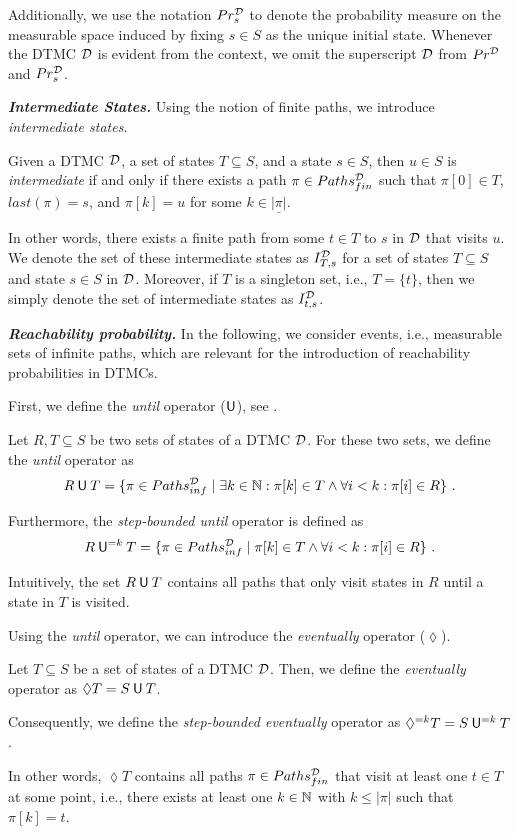 Additionally, we use the notation $Pr^{\mathcal{D}}_s$ to denote the probability measure on the measurable space induced by fixing $s\in S$ as the unique initial state. Whenever the DTMC $\mathcal{D}$ is evident from the context, we omit the superscript $\mathcal{D}$ from $Pr^{\mathcal{D}}$ and $Pr_s^{\mathcal{D}}$.

\emph{\textbf{Intermediate States.}} Using the notion of finite paths, we introduce \textit{intermediate states}.

\begin{definition}\label{def:intermediate_state}
    Given a DTMC $\mathcal{D}$, a set of states $T\subseteq S$, and a state $s \in S$, then $u\in S$ is \textit{intermediate} if and only if there exists a path $\pi \in Paths^{\mathcal{D}}_{fin}$ such that $\pi[0]\in T$, $last(\pi) = s$, and $\pi[k] = u$ for some $k\in \underline{|\pi|}$. 
\end{definition}
In other words, there exists a finite path from some $t\in T$ to $s$ in $\mathcal{D}$ that visits $u$.
We denote the set of these intermediate states as $I^{\mathcal{D}}_{T,s}$ for a set of states $T\subseteq S$ and state $s\in S$ in $\mathcal{D}$. Moreover, if $T$ is a singleton set, i.e., $T =\{t\}$, then we simply denote the set of intermediate states as $I^{\mathcal{D}}_{t,s}$.

\emph{\textbf{Reachability probability.}} In the following, we consider events, i.e., measurable sets of infinite paths, which are relevant for the introduction of reachability probabilities in DTMCs.

First, we define the \textit{until} operator ($\mathbin{\mathsf{U}}$), see \cite{Bibel}.
\begin{definition}\label{def:constrained_reachability_probabilities}
    Let $R,T \subseteq S$ be two sets of states of a DTMC $\mathcal{D}$. For these two sets, we define the \textit{until} operator as
    \[R\mathbin{\mathsf{U}} T = \{\pi \in Paths^{\mathcal{D}}_{inf}\mid\exists k\in \mathbb{N}: \pi[k]\in T\land \forall i <k: \pi [i]\in R\} \ .\]

    Furthermore, the \textit{step-bounded until} operator is defined as
    \[R\mathbin{\mathsf{U}}^{=k} T = \{\pi \in Paths^{\mathcal{D}}_{inf} \mid \pi[k]\in T\land \forall i <k: \pi [i]\in R\} \ .\]

\end{definition}
Intuitively, the set $R\mathbin{\mathsf{U}} T$ contains all paths that only visit states in $R$ until a state in $T$ is visited.

Using the \textit{until} operator, we can introduce the \textit{eventually} operator ($\lozenge$).

\begin{definition}
    Let $T\subseteq S$ be a set of states of a DTMC $\mathcal{D}$. Then, we define the \textit{eventually} operator as $\lozenge T = S \mathbin{\mathsf{U}} T$.
    
    Consequently, we define the \textit{step-bounded eventually} operator as $\lozenge^{=k} T = S \mathbin{\mathsf{U}}^{=k} T$.
\end{definition}
In other words, $\lozenge T$ contains all paths $\pi \in Paths^{\mathcal{D}}_{fin}$ that visit at least one $t\in T$ at some point, i.e., there exists at least one $k \in \mathbb{N}$ with $k \leq |\pi|$ such that $\pi[k] = t$.

